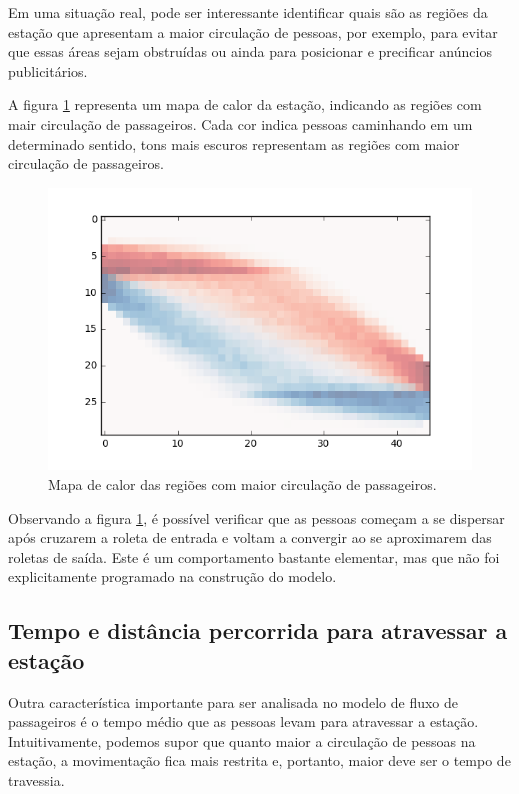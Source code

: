 \documentclass[preprint,12pt]{elsarticle}
\begin{document}
Em uma situação real, pode ser interessante identificar quais são as regiões da estação que apresentam a maior circulação de pessoas, por exemplo, para evitar que essas áreas sejam obstruídas ou ainda para posicionar e precificar anúncios publicitários.

A figura \ref{fig:heatmap} representa um mapa de calor da estação, indicando as regiões com mair circulação de passageiros. Cada cor indica pessoas caminhando em um determinado sentido, tons mais escuros representam as regiões com maior circulação de passageiros.

\begin{figure}[H]
	\centering
	\includegraphics[totalheight=7cm]{figures/heatmap.png}
	\caption{Mapa de calor das regiões com maior circulação de passageiros.}
	\label{fig:heatmap}
\end{figure}

Observando a figura \ref{fig:heatmap}, é possível verificar que as pessoas começam a se dispersar após cruzarem a roleta de entrada e voltam a convergir ao se aproximarem das roletas de saída. Este é um comportamento bastante elementar, mas que não foi explicitamente programado na construção do modelo.

\subsection{Tempo e distância percorrida para atravessar a estação}
\label{subsec:tempo_travessia}

Outra característica importante para ser analisada no modelo de fluxo de passageiros é o tempo médio que as pessoas levam para atravessar a estação. Intuitivamente, podemos supor que quanto maior a circulação de pessoas na estação, a movimentação fica mais restrita e, portanto, maior deve ser o tempo de travessia.
\end{document}
